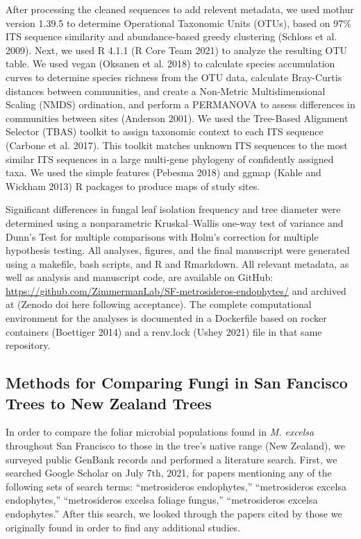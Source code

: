 \documentclass[fleqn,10pt,lineno]{wlpeerj} %
\begin{document}
After processing the cleaned sequences to add relevent metadata, we used mothur version 1.39.5 to determine Operational Taxonomic Units (OTUs), based on 97\% ITS sequence similarity and abundance-based greedy clustering (Schloss et al. 2009). Next, we used R 4.1.1 (R Core Team 2021) to analyze the resulting OTU table. We used vegan (Oksanen et al. 2018) to calculate species accumulation curves to determine species richness from the OTU data, calculate Bray-Curtis distances between communities, and create a Non-Metric Multidimensional Scaling (NMDS) ordination, and perform a PERMANOVA to assess differences in communities between sites (Anderson 2001). We used the Tree-Based Alignment Selector (TBAS) toolkit to assign taxonomic context to each ITS sequence (Carbone et al. 2017). This toolkit matches unknown ITS sequences to the most similar ITS sequences in a large multi-gene phylogeny of confidently assigned taxa. We used the simple features (Pebesma 2018) and ggmap (Kahle and Wickham 2013) R packages to produce maps of study sites.

Significant differences in fungal leaf isolation frequency and tree diameter were determined using a nonparametric Kruskal--Wallis one-way test of variance and Dunn's Test for multiple comparisons with Holm's correction for multiple hypothesis testing. All analyses, figures, and the final manuscript were generated using a makefile, bash scripts, and R and Rmarkdown. All relevant metadata, as well as analysis and manuscript code, are available on GitHub: \url{https://github.com/ZimmermanLab/SF-metrosideros-endophytes/} and archived at (Zenodo doi here following acceptance). The complete computational environment for the analyses is documented in a Dockerfile based on rocker containers (Boettiger 2014) and a renv.lock (Ushey 2021) file in that same repository.

\hypertarget{methods-for-comparing-fungi-in-san-fancisco-trees-to-new-zealand-trees}{%
\subsection*{Methods for Comparing Fungi in San Fancisco Trees to New Zealand Trees}\label{methods-for-comparing-fungi-in-san-fancisco-trees-to-new-zealand-trees}}

In order to compare the foliar microbial populations found in \emph{M. excelsa} throughout San Francisco to those in the tree's native range (New Zealand), we surveyed public GenBank records and performed a literature search. First, we searched Google Scholar on July 7th, 2021, for papers mentioning any of the following sets of search terms: ``metrosideros endophytes,'' ``metrosideros excelsa endophytes,'' ``metrosideros excelsa foliage fungus,'' ``metrosideros excelsa endophytes.'' After this search, we looked through the papers cited by those we originally found in order to find any additional studies.
\end{document}
